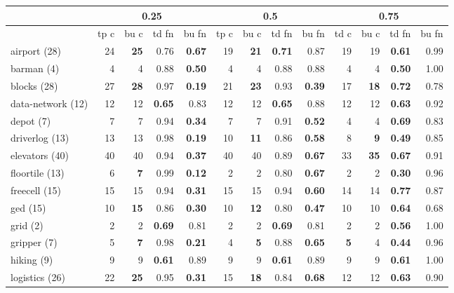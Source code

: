 
\begin{tabular}{l||rr|rr||rr|rr||rr|rr}
	& \multicolumn{4}{c}{0.25} & \multicolumn{4}{|c}{0.5} & \multicolumn{4}{|c}{0.75} \\\hline
		& tp c & bu c  & td fn & bu fn & tp c & bu c & td fn & bu fn & td c & bu c  & td fn & bu fn \\\hline
	airport (28) & 24 & \textbf{25}  & 0.76 & \textbf{0.67}  & 19 & \textbf{21}  & \textbf{0.71}  & 0.87 & 19 & 19 & \textbf{0.61}  & 0.99\\
	barman (4) & 4 & 4 & 0.88 & \textbf{0.50}  & 4 & 4 & 0.88 & 0.88 & 4 & 4 & \textbf{0.50}  & 1.00\\
	blocks (28) & 27 & \textbf{28}  & 0.97 & \textbf{0.19}  & 21 & \textbf{23}  & 0.93 & \textbf{0.39}  & 17 & \textbf{18}  & \textbf{0.72}  & 0.78\\
	data-network (12) & 12 & 12 & \textbf{0.65}  & 0.83 & 12 & 12 & \textbf{0.65}  & 0.88 & 12 & 12 & \textbf{0.63}  & 0.92\\
	depot (7) & 7 & 7 & 0.94 & \textbf{0.34}  & 7 & 7 & 0.91 & \textbf{0.52}  & 4 & 4 & \textbf{0.69}  & 0.83\\
	driverlog (13) & 13 & 13 & 0.98 & \textbf{0.19}  & 10 & \textbf{11}  & 0.86 & \textbf{0.58}  & 8 & \textbf{9}  & \textbf{0.49}  & 0.85\\
	elevators (40) & 40 & 40 & 0.94 & \textbf{0.37}  & 40 & 40 & 0.89 & \textbf{0.67}  & 33 & \textbf{35}  & \textbf{0.67}  & 0.91\\
	floortile (13) & 6 & \textbf{7}  & 0.99 & \textbf{0.12}  & 2 & 2 & 0.80 & \textbf{0.67}  & 2 & 2 & \textbf{0.30}  & 0.96\\
	freecell (15) & 15 & 15 & 0.94 & \textbf{0.31}  & 15 & 15 & 0.94 & \textbf{0.60}  & 14 & 14 & \textbf{0.77}  & 0.87\\
	ged (15) & 10 & \textbf{15}  & 0.86 & \textbf{0.30}  & 10 & \textbf{12}  & 0.80 & \textbf{0.47}  & 10 & 10 & \textbf{0.64}  & 0.68\\
	grid (2) & 2 & 2 & \textbf{0.69}  & 0.81 & 2 & 2 & \textbf{0.69}  & 0.81 & 2 & 2 & \textbf{0.56}  & 1.00\\
	gripper (7) & 5 & \textbf{7}  & 0.98 & \textbf{0.21}  & 4 & \textbf{5}  & 0.88 & \textbf{0.65}  & \textbf{5}  & 4 & \textbf{0.44}  & 0.96\\
	hiking (9) & 9 & 9 & \textbf{0.61}  & 0.89 & 9 & 9 & \textbf{0.61}  & 0.89 & 9 & 9 & \textbf{0.61}  & 1.00\\
	logistics (26) & 22 & \textbf{25}  & 0.95 & \textbf{0.31}  & 15 & \textbf{18}  & 0.84 & \textbf{0.68}  & 12 & 12 & \textbf{0.63}  & 0.90\\

\end{tabular}
